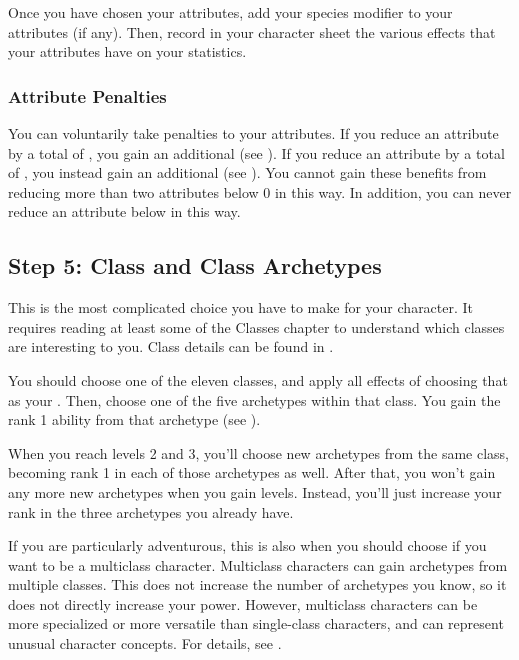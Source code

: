     Once you have chosen your attributes, add your species modifier to your attributes (if any).
    Then, record in your character sheet the various effects that your attributes have on your statistics.

    \subsubsection{Attribute Penalties}\label{Attribute Penalties}
      You can voluntarily take penalties to your attributes.
      If you reduce an attribute by a total of , you gain an additional  (see ).
      If you reduce an attribute by a total of , you instead gain an additional  (see ).
      You cannot gain these benefits from reducing more than two attributes below 0 in this way.
      In addition, you can never reduce an attribute below  in this way.

  \subsection{Step 5: Class and Class Archetypes}
    This is the most complicated choice you have to make for your character.
    It requires reading at least some of the Classes chapter to understand which classes are interesting to you.
    Class details can be found in .

    You should choose one of the eleven classes, and apply all effects of choosing that as your .
    Then, choose one of the five archetypes within that class.
    You gain the rank 1 ability from that archetype (see ).

    When you reach levels 2 and 3, you'll choose new archetypes from the same class, becoming rank 1 in each of those archetypes as well.
    After that, you won't gain any more new archetypes when you gain levels.
    Instead, you'll just increase your rank in the three archetypes you already have.

    If you are particularly adventurous, this is also when you should choose if you want to be a multiclass character.
    Multiclass characters can gain archetypes from multiple classes.
    This does not increase the number of archetypes you know, so it does not directly increase your power.
    However, multiclass characters can be more specialized or more versatile than single-class characters, and can represent unusual character concepts.
    For details, see .

